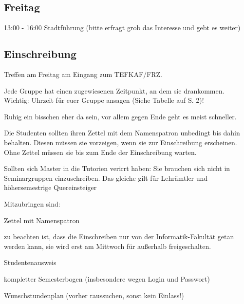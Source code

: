 \documentclass[a4paper,12pt]{report}
\begin{document}
\subsection{Freitag}
13:00 - 16:00 Stadtführung (bitte erfragt grob das Interesse und gebt es weiter)\\

\subsection{Einschreibung}
\begin{itemize*}
\item Treffen am Freitag am Eingang zum TEFKAF/FRZ.
\item Jede Gruppe hat einen zugewiesenen Zeitpunkt, an dem sie drankommen. Wichtig: Uhrzeit für euer Gruppe ansagen (Siehe Tabelle auf S. 2)!
\item Ruhig ein bisschen eher da sein, vor allem gegen Ende geht es meist schneller.
\item Die Studenten sollten ihren Zettel mit dem Namenspatron unbedingt bis dahin behalten. Diesen müssen sie vorzeigen, wenn sie zur Einschreibung erscheinen. Ohne Zettel müssen sie bis zum Ende der Einschreibung warten.
\item Sollten sich Master in die Tutorien verirrt haben: Sie brauchen sich nicht in Seminargruppen einzuschreiben. Das gleiche gilt für Lehrämtler und höhersemestrige Quereinsteiger
\item Mitzubringen sind:
\begin{itemize*}
\item Zettel mit Namenspatron
\item zu beachten ist, dass die Einschreiben nur von der Informatik-Fakultät getan werden kann, sie wird erst am Mittwoch für außerhalb freigeschalten.
\item Studentenausweis
\item kompletter Semesterbogen (insbesondere wegen Login und Passwort)
\item Wunschstundenplan (vorher raussuchen, sonst kein Einlass!)


\end{itemize*}
\end{itemize*}
\end{document}
